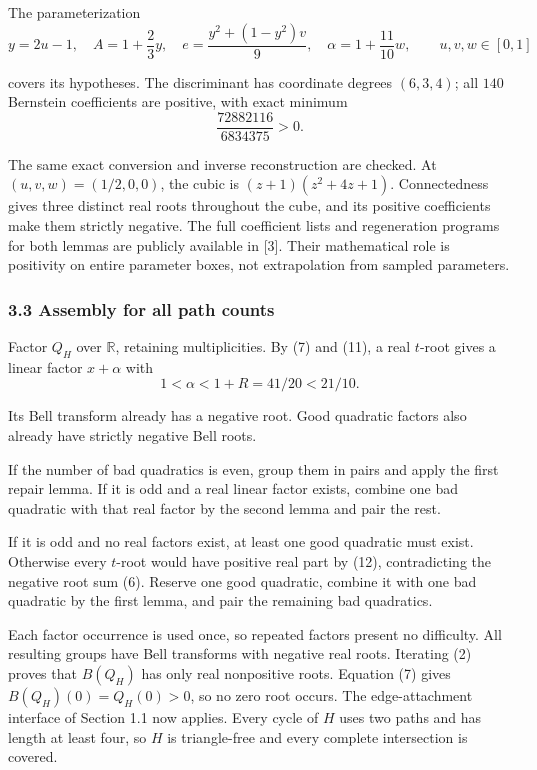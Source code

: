 \documentclass[
  11pt,
  a4paper,
]{article}
\begin{document}
The parameterization
\nopagebreak
\[
y=2u-1,\quad A=1+\frac23y,\quad
e=\frac{y^2+(1-y^2)v}{9},\quad
\alpha=1+\frac{11}{10}w,\qquad u,v,w\in[0,1]
\]

covers its hypotheses. The discriminant has coordinate degrees
\((6,3,4)\); all \(140\) Bernstein coefficients are positive, with exact
minimum
\nopagebreak
\[
\frac{72882116}{6834375}>0.\tag{18}
\]

The same exact conversion and inverse reconstruction are checked. At
\((u,v,w)=(1/2,0,0)\), the cubic is \((z+1)(z^2+4z+1)\). Connectedness
gives three distinct real roots throughout the cube, and its positive
coefficients make them strictly negative. The full coefficient lists and
regeneration programs for both lemmas are publicly available in {[}3{]}.
Their mathematical role is positivity on entire parameter boxes, not
extrapolation from sampled parameters.

\subsubsection{3.3 Assembly for all path
counts}\label{assembly-for-all-path-counts}

Factor \(Q_H\) over \(\mathbb R\), retaining multiplicities. By (7) and
(11), a real \(t\)-root gives a linear factor \(x+\alpha\) with
\nopagebreak
\[
1<\alpha<1+R=41/20<21/10.
\]

Its Bell transform already has a negative root. Good quadratic factors
also already have strictly negative Bell roots.

If the number of bad quadratics is even, group them in pairs and apply
the first repair lemma. If it is odd and a real linear factor exists,
combine one bad quadratic with that real factor by the second lemma and
pair the rest.

If it is odd and no real factors exist, at least one good quadratic must
exist. Otherwise every \(t\)-root would have positive real part by (12),
contradicting the negative root sum (6). Reserve one good quadratic,
combine it with one bad quadratic by the first lemma, and pair the
remaining bad quadratics.

Each factor occurrence is used once, so repeated factors present no
difficulty. All resulting groups have Bell transforms with negative real
roots. Iterating (2) proves that \(B(Q_H)\) has only real nonpositive
roots. Equation (7) gives \(B(Q_H)(0)=Q_H(0)>0\), so no zero root
occurs. The edge-attachment interface of Section 1.1 now applies. Every
cycle of \(H\) uses two paths and has length at least four, so \(H\) is
triangle-free and every complete intersection is covered.
\end{document}
